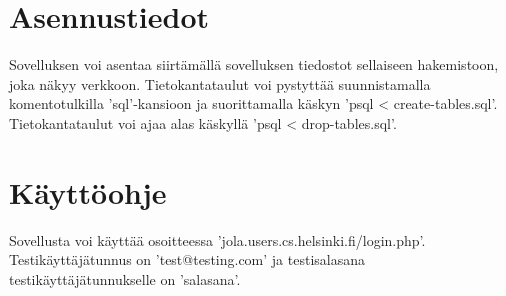 \documentclass[a4paper, 12pt finnish]{article}
\begin{document}
\section{Asennustiedot} Sovelluksen voi asentaa siirtämällä
sovelluksen tiedostot sellaiseen hakemistoon, joka näkyy
verkkoon. Tietokantataulut voi pystyttää suunnistamalla
komentotulkilla 'sql'-kansioon ja suorittamalla käskyn
'psql < create-tables.sql'. Tietokantataulut voi ajaa
alas käskyllä 'psql < drop-tables.sql'.

\section{Käyttöohje} Sovellusta voi käyttää osoitteessa
'jola.users.cs.helsinki.fi/login.php'.
Testikäyttäjätunnus on 'test@testing.com' ja
testisalasana testikäyttäjätunnukselle on 'salasana'.
\end{document}
